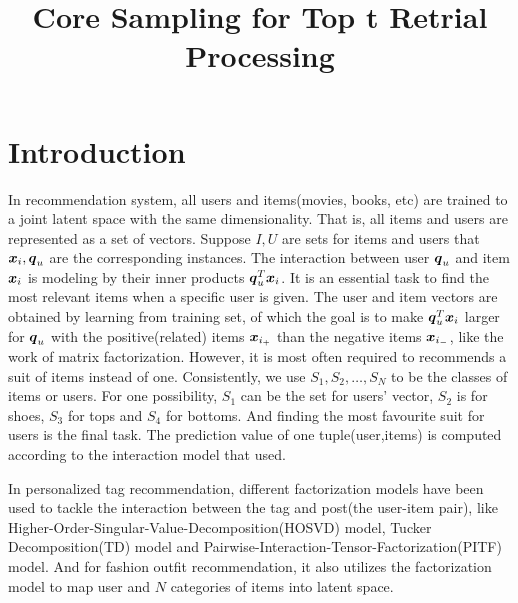 \documentclass[letterpaper]{article}
\title{Core Sampling for Top t Retrial Processing}
\author{}
\newcommand{\V}[1]{{\bm{{\MakeLowercase{#1}}}}}
\begin{document}
\maketitle

\section{Introduction}

In recommendation system,
all users and items(movies, books, etc) are trained to a joint latent space with the same dimensionality.
That is, all items and users are represented as a set of vectors.
Suppose $I,U$ are sets for items and users that $\V{x}_i,\V{q}_u$ are the corresponding instances.
The interaction between user $\V{q}_u$ and item $\V{x}_i$ is modeling by their inner products $\V{q}_u^T\V{x}_i$.
It is an essential task to find the most relevant items when a specific user is given.
The user and item vectors are obtained by learning from training set,
of which the goal is to make $\V{q}_u^T\V{x}_i$ larger for $\V{q}_u$
with the positive(related) items $\V{x}_{i_+}$ than the negative items $\V{x}_{i_-}$,
like the work of matrix factorization\cite{KoYe09}.
However, it is most often required to recommends a suit of items instead of one.
Consistently, we use $S_1,S_2,\ldots,S_N$ to be the classes
of items or users.
For one possibility, $S_1$ can be the set for users' vector,
$S_2$ is for shoes, $S_3$ for tops and $S_4$ for bottoms.
And finding the most favourite suit for users is the final task.
The prediction value of one tuple(user,items) is computed according to the
interaction model that used.

In personalized tag recommendation,
different factorization models have been used to tackle the interaction
between the tag and post(the user-item pair),
like Higher-Order-Singular-Value-Decomposition(HOSVD) model\cite{SyNa08},
Tucker Decomposition(TD) model\cite{Rendle_RTF} and
Pairwise-Interaction-Tensor-Factorization(PITF) model\cite{Rendle_PITF}.
And for fashion outfit recommendation\cite{HuYiLa15},
it also utilizes the factorization model to
map user and $N$ categories of items into latent space.
\end{document}
